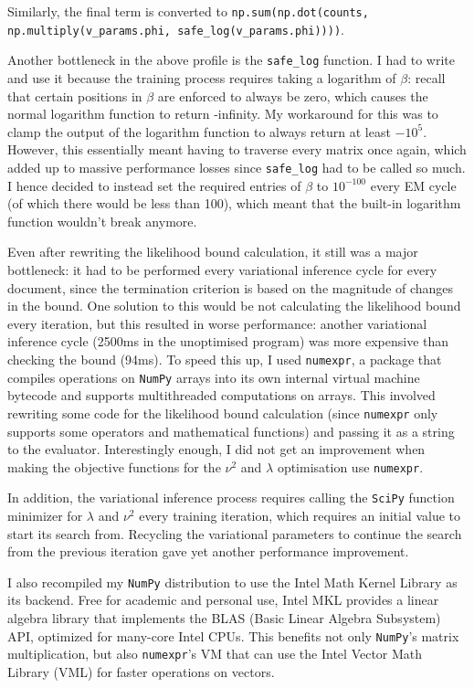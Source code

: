 \documentclass[12pt,a4paper,twoside,openright]{report}
\begin{document}
Similarly, the final term is converted to \texttt{np.sum(np.dot(counts, np.multiply(v\_params.phi, safe\_log(v\_params.phi))))}.

Another bottleneck in the above profile is the \texttt{safe\_log} function. I had to write and use it because the training process requires taking a logarithm of $\beta$: recall that certain positions in $\beta$ are enforced to always be zero, which causes the normal logarithm function to return -infinity. My workaround for this was to clamp the output of the logarithm function to always return at least $-10^5$. However, this essentially meant having to traverse every matrix once again, which added up to massive performance losses since \texttt{safe\_log} had to be called so much. I hence decided to instead set the required entries of $\beta$ to $10^{-100}$ every EM cycle (of which there would be less than 100), which meant that the built-in logarithm function wouldn't break anymore.

Even after rewriting the likelihood bound calculation, it still was a major bottleneck: it had to be performed every variational inference cycle for every document, since the termination criterion is based on the magnitude of changes in the bound. One solution to this would be not calculating the likelihood bound every iteration, but this resulted in worse performance: another variational inference cycle (2500ms in the unoptimised program) was more expensive than checking the bound (94ms). To speed this up, I used \texttt{numexpr}, a package that compiles operations on \texttt{NumPy} arrays into its own internal virtual machine bytecode and supports multithreaded computations on arrays. This involved rewriting some code for the likelihood bound calculation (since \texttt{numexpr} only supports some operators and mathematical functions) and passing it as a string to the evaluator. Interestingly enough, I did not get an improvement when making the objective functions for the $\nu^2$ and $\lambda$ optimisation use \texttt{numexpr}.

In addition, the variational inference process requires calling the \texttt{SciPy} function minimizer for $\lambda$ and $\nu^2$ every training iteration, which requires an initial value to start its search from. Recycling the variational parameters to continue the search from the previous iteration gave yet another performance improvement.

I also recompiled my \texttt{NumPy} distribution to use the Intel Math Kernel Library as its backend. Free for academic and personal use, Intel MKL provides a linear algebra library that implements the BLAS (Basic Linear Algebra Subsystem) API, optimized for many-core Intel CPUs. This benefits not only \texttt{NumPy}'s matrix multiplication, but also \texttt{numexpr}'s VM that can use the Intel Vector Math Library (VML) for faster operations on vectors.
\end{document}
